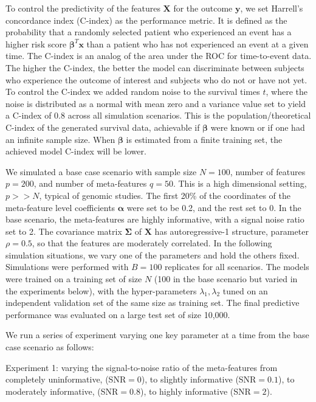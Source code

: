 To control the predictivity of the features $\bm{X}$ for the outcome $\bm{y}$, we set Harrell’s concordance index (C-index) \citep{harrell1982evaluating} as the performance metric. It is defined as the probability that a randomly selected patient who experienced an event has a higher risk score $\bm{\beta}^T\bm{x}$ than a patient who has not experienced an event at a given time. The C-index is an analog of the area under the ROC for time-to-event data. The higher the C-index, the better the model can discriminate between subjects who experience the outcome of interest and subjects who do not or have not yet. To control the C-index we added random noise to the survival times $t$, where the noise is distributed as a normal with mean zero and a variance value set to yield a C-index of 0.8 across all simulation scenarios. This is the population/theoretical C-index of the generated survival data, achievable if $\bm{\beta}$ were known or if one had an infinite sample size. When $\bm{\beta}$ is estimated from a finite training set, the achieved model C-index will be lower.

We simulated a base case scenario with sample size $N=100$, number of features $p=200$, and number of meta-features $q=50$. This is a high dimensional setting, $p>>N$, typical of genomic studies. The first 20\% of the coordinates of the meta-feature level coefficients $\bm{\alpha}$ were set to be 0.2, and the rest set to 0. In the base scenario, the meta-features are highly informative, with a signal noise ratio set to 2. The covariance matrix $\bm{\Sigma}$ of $\bm{X}$ has autoregressive-1 structure, parameter $\rho=0.5$, so that the features are moderately correlated. In the following simulation situations, we vary one of the parameters and hold the others fixed. Simulations were performed with $B=100$ replicates for all scenarios. The models were trained on a training set of size $N$ (100 in the base scenario but varied in the experiments below), with the hyper-parameters $\lambda_1,\lambda_2$ tuned on an independent validation set of the same size as training set. The final predictive performance was evaluated on a large test set of size 10,000.

We run a series of experiment varying one key parameter at a time from the base case scenario as follows:

Experiment 1: varying the signal-to-noise ratio of the meta-features from completely uninformative, (SNR$=0$), to slightly informative (SNR$=0.1$), to moderately informative, (SNR$=0.8$), to highly informative (SNR$=2$).

